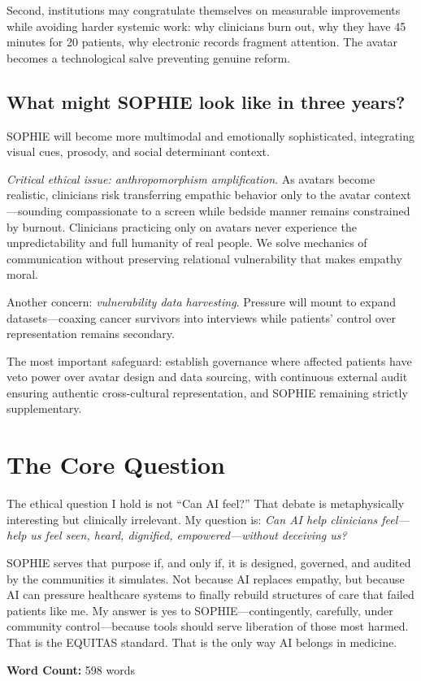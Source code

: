 \documentclass[12pt,twoside]{article}
\begin{document}
Second, institutions may congratulate themselves on measurable improvements while avoiding harder systemic work: why clinicians burn out, why they have 45 minutes for 20 patients, why electronic records fragment attention. The avatar becomes a technological salve preventing genuine reform.

\subsection*{What might SOPHIE look like in three years?}

SOPHIE will become more multimodal and emotionally sophisticated, integrating visual cues, prosody, and social determinant context.

\emph{Critical ethical issue: anthropomorphism amplification}. As avatars become realistic, clinicians risk transferring empathic behavior only to the avatar context—sounding compassionate to a screen while bedside manner remains constrained by burnout. Clinicians practicing only on avatars never experience the unpredictability and full humanity of real people. We solve mechanics of communication without preserving relational vulnerability that makes empathy moral.

Another concern: \emph{vulnerability data harvesting}. Pressure will mount to expand datasets—coaxing cancer survivors into interviews while patients' control over representation remains secondary.

The most important safeguard: establish governance where affected patients have veto power over avatar design and data sourcing, with continuous external audit ensuring authentic cross-cultural representation, and SOPHIE remaining strictly supplementary.

\section*{The Core Question}

The ethical question I hold is not \enquote{Can AI feel?} That debate is metaphysically interesting but clinically irrelevant. My question is: \emph{Can AI help clinicians feel—help us feel seen, heard, dignified, empowered—without deceiving us?}

SOPHIE serves that purpose if, and only if, it is designed, governed, and audited by the communities it simulates. Not because AI replaces empathy, but because AI can pressure healthcare systems to finally rebuild structures of care that failed patients like me. My answer is yes to SOPHIE—contingently, carefully, under community control—because tools should serve liberation of those most harmed. That is the EQUITAS standard. That is the only way AI belongs in medicine.

\vfill
\noindent\centering\footnotesize\textbf{Word Count:} 598 words
\end{document}
